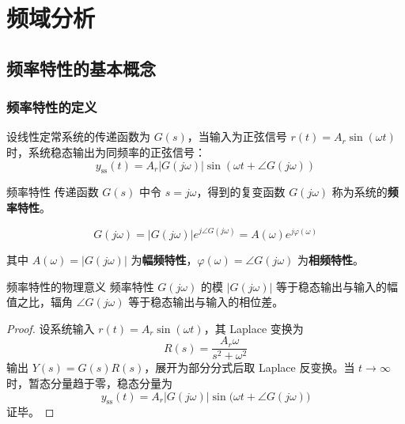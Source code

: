 
\chapter{频域分析}


\section{频率特性的基本概念}

\subsection{频率特性的定义}

设线性定常系统的传递函数为 $G(s)$，当输入为正弦信号 $r(t) = A_r \sin(\omega t)$ 时，系统稳态输出为同频率的正弦信号：
\[
y_{\text{ss}}(t) = A_r |G(j\omega)| \sin(\omega t + \angle G(j\omega))
\]

\begin{mydefinition}{频率特性}
传递函数 $G(s)$ 中令 $s = j\omega$，得到的复变函数 $G(j\omega)$ 称为系统的\textbf{频率特性}。

\[
G(j\omega) = |G(j\omega)| e^{j\angle G(j\omega)} = A(\omega) e^{j\varphi(\omega)}
\]

其中 $A(\omega)=|G(j\omega)|$ 为\textbf{幅频特性}，$\varphi(\omega)=\angle G(j\omega)$ 为\textbf{相频特性}。
\end{mydefinition}

\begin{myTheorem}{频率特性的物理意义}
频率特性 $G(j\omega)$ 的模 $|G(j\omega)|$ 等于稳态输出与输入的幅值之比，辐角 $\angle G(j\omega)$ 等于稳态输出与输入的相位差。
\end{myTheorem}

\begin{proof}
设系统输入 $r(t) = A_r \sin(\omega t)$，其 Laplace 变换为
\[
R(s) = \frac{A_r \omega}{s^2 + \omega^2}
\]
输出 $Y(s) = G(s)R(s)$，展开为部分分式后取 Laplace 反变换。当 $t \to \infty$ 时，暂态分量趋于零，稳态分量为
\[
y_{\text{ss}}(t) = A_r |G(j\omega)| \sin\bigl(\omega t + \angle G(j\omega)\bigr)
\]
证毕。
\end{proof}

